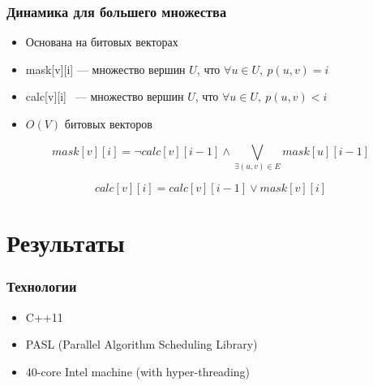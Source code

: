 \documentclass[10pt, compress]{beamer}
\begin{document}
\begin{frame}[fragile]
  \frametitle{Динамика для большего множества}
    \begin{itemize}
    	\item Основана на битовых векторах
		\item mask[v][i] --- множество вершин $U$, что $\forall u \in U, \ p(u, v) = i$
		\item calc[v][i] $ \ \ $--- множество вершин $U$, что  $\forall u \in U, \ p(u, v) < i$
		\item $O(V)$ битовых векторов
	\end{itemize}
	
	\begin{equation}
mask[v][i] = \neg calc[v][i - 1] \wedge \bigvee_{\exists (u, v) \in E} mask[u][i - 1] 
\end{equation}

\begin{equation}
calc[v][i] = calc[v][i - 1] \vee mask[v][i]
\end{equation}

\end{frame}

\section{Результаты}

\begin{frame}[fragile]
  \frametitle{Технологии}
\begin{itemize}
    \item C++11
    \item PASL (Parallel Algorithm Scheduling Library)
    \item 40-core Intel machine (with hyper-threading) 
  \end{itemize}
\end{frame}


\end{document}
